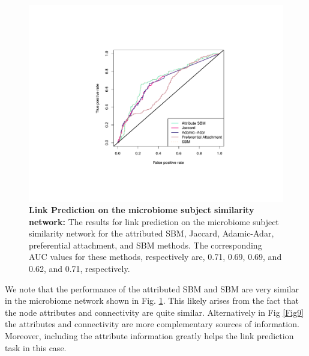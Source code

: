 \begin{figure}
\begin{center}
\includegraphics[width=.5\textwidth]{ROC_Microbiome.pdf}
\caption{{\bf Link Prediction on the microbiome subject similarity network:} The results for link prediction on the microbiome subject similarity network for the attributed SBM, Jaccard, Adamic-Adar, preferential attachment, and SBM methods. The corresponding AUC values for these methods, respectively are, 0.71, 0.69, 0.69, and 0.62, and 0.71, respectively.}
\label{Fig5}
\end{center}
\end{figure}

We note that the performance of the attributed SBM and SBM are very similar in the microbiome network shown in Fig. \ref{Fig5}. This likely arises from the fact that the node attributes and connectivity are quite similar. Alternatively in Fig \ref{Fig9} the attributes and connectivity are more complementary sources of information. Moreover, including the attribute information greatly helps the link prediction task in this case.   

